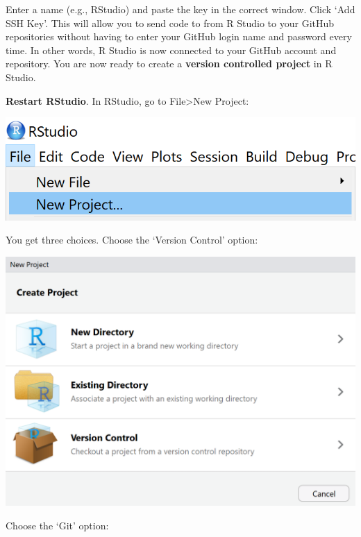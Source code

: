 \documentclass[
  oneside]{book}
\begin{document}
Enter a name (e.g., RStudio) and paste the key in the correct window. Click `Add
SSH Key'. This will allow you to send code to from R Studio to your GitHub
repositories without having to enter your GitHub login name and password every
time. In other words, R Studio is now connected to your GitHub account and
repository. You are now ready to create a \textbf{version controlled project} in R
Studio.

\textbf{Restart RStudio}. In RStudio, go to File\textgreater New Project:

\begin{center}\includegraphics[width=1\linewidth]{images/7549d0317ad5f80afe7f3c6be4ad0ba3} \end{center}

You get three choices. Choose the `Version Control' option:

\begin{center}\includegraphics[width=1\linewidth]{images/5eff851f02909023dac665978c716a9d} \end{center}

Choose the `Git' option:
\end{document}

